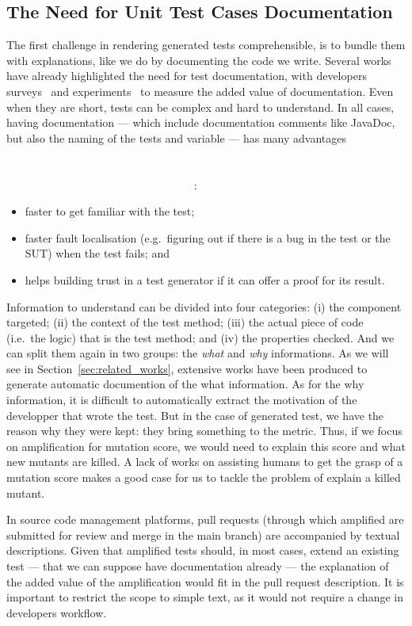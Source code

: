 \documentclass[11pt]{sdm_internship}
\newcommand{\addref}[1]{\colorbox{TealBlue!100}{\textcolor{white}{\textbf{$[$\ifx&#1&\ \else#1\fi$]$}}}}
\theoremstyle{definition}
\begin{document}
\subsection{The Need for Unit Test Cases Documentation}%
\label{ssec:need_doc}
The first challenge in rendering generated tests comprehensible, is to bundle them with explanations, like we do by documenting the code we write.
Several works have already highlighted the need for test documentation, with developers surveys~\cite{daka2014survey,prado2015wap,prado2016advances,prado2018towards,li2016automatically} and experiments~\cite{panichella2016impact} to measure the added value of documentation.
Even when they are short, tests can be complex and hard to understand.
In all cases, having documentation --- which include documentation comments like JavaDoc, but also the naming of the tests and variable --- has many advantages~\cite{daka2017generating}\addref{How Do Automatically Generated Unit Tests Influence Software Maintenance?}:
\begin{itemize}
  \item faster to get familiar with the test;
  \item faster fault localisation (e.g.\ figuring out if there is a bug in the test or the SUT) when the test fails; and
  \item helps building trust in a test generator if it can offer a proof for its result.
\end{itemize}

Information to understand can be divided into four categories: (i) the component targeted; (ii) the context of the test method; (iii) the actual piece of code (i.e.\ the logic) that is the test method; and (iv) the properties checked.
And we can split them again in two groups: the \emph{what} and \emph{why} informations.
As we will see in Section~\ref{sec:related_works}, extensive works have been produced to generate automatic documention of the what information.
As for the why information, it is difficult to automatically extract the motivation of the developper that wrote the test.
But in the case of generated test, we have the reason why they were kept: they bring something to the metric.
Thus, if we focus on amplification for mutation score, we would need to explain this score and what new mutants are killed.
A lack of works on assisting humans to get the grasp of a mutation score makes a good case for us to tackle the problem of explain a killed mutant.

In source code management platforms, pull requests (through which amplified are submitted for review and merge in the main branch) are accompanied by textual descriptions.
Given that amplified tests should, in most cases, extend an existing test --- that we can suppose have documentation already --- the explanation of the added value of the amplification would fit in the pull request description.
It is important to restrict the scope to simple text, as it would not require a change in developers workflow.
\end{document}
